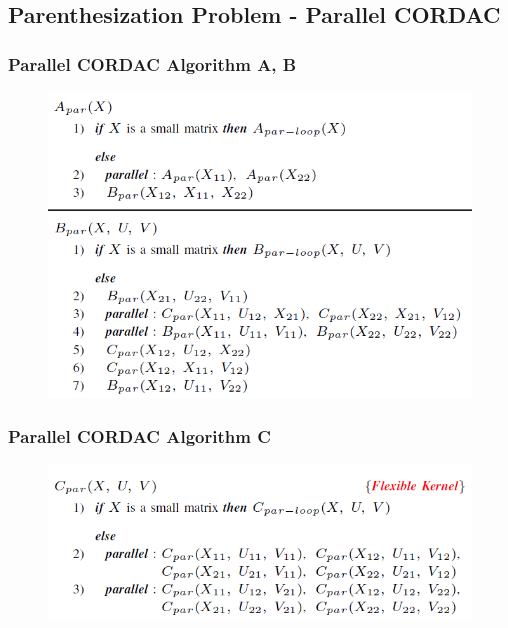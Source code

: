 \subsection{Parenthesization Problem - Parallel CORDAC}
\begin{frame}
    \frametitle{Parallel CORDAC Algorithm A, B}
    \begin{figure}
		\includegraphics[scale=0.5]{figure/fig-parenthesis-parallel-1.png}
	\end{figure}
\end{frame}

\begin{frame}
    \frametitle{Parallel CORDAC Algorithm C}
    \begin{figure}
		\includegraphics[scale=0.5]{figure/fig-parenthesis-parallel-2.png}
	\end{figure}
\end{frame}

